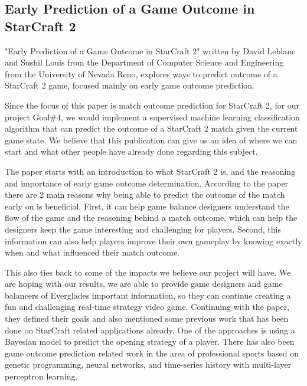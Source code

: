 \documentclass[a4paper,12pt]{report}
\begin{document}
\subsection{Early Prediction of a Game Outcome in StarCraft 2}

"Early Prediction of a Game Outcome in StarCraft 2" written by David Leblanc and Sushil Louis from the Department of Computer Science and Engineering from the University of Nevada Reno, explores ways to predict outcome of a StarCraft 2 game, focused mainly on early game outcome prediction.

Since the focus of this paper is match outcome prediction for StarCraft 2, for our project Goal\#4, we would implement a supervised machine learning classification algorithm that can predict the outcome of a StarCraft 2 match given the current game state. We believe that this publication can give us an idea of where we can start and what other people have already done regarding this subject.

The paper starts with an introduction to what StarCraft 2 is, and the reasoning and importance of early game outcome determination. According to the paper there are 2 main reasons why being able to predict the outcome of the match early on is beneficial. First, it can help game balance designers understand the flow of the game and the reasoning behind a match outcome, which can help the designers keep the game interesting and challenging for players. Second, this information can also help players improve their own gameplay by knowing exactly when and what influenced their match outcome.

This also ties back to some of the impacts we believe our project will have. We are hoping with our results, we are able to provide game designers and game balancers of Everglades important information, so they can continue creating a fun and challenging real-time strategy video game.
Continuing with the paper, they defined their goals and also mentioned some previous work that has been done on StarCraft related applications already. One of the approaches is using a Bayesian model to predict the opening strategy of a player. There has also been game outcome prediction related work in the area of professional sports based on genetic programming, neural networks, and time-series history with multi-layer perceptron learning.
\end{document}
